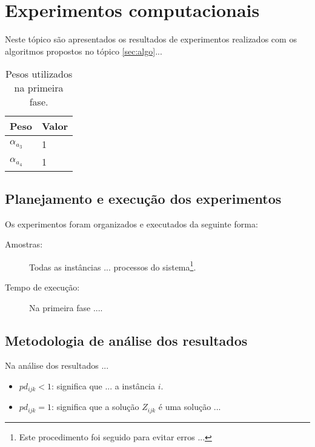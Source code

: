 \chapter{Experimentos computacionais}
\label{sec:experimentos}

Neste tópico são apresentados os resultados de experimentos realizados com os algoritmos propostos no tópico \ref{sec:algo}...

\begin{table*}[htbp]
	\centering
	\caption{Pesos utilizados na primeira fase.}
	\label{tab:pesos_primeira_fase}

	\begin{tabular}{|>{\centering}p{2cm}|p{3cm}<{\centering}|}\hline
		\textbf{Peso} & \textbf{Valor} \\ \hline
		$\alpha_{a_3}$ & 1 \\ \hline
		$\alpha_{a_4}$ & 1 \\ \hline
	\end{tabular}
\end{table*}


\section{Planejamento e execução dos experimentos}

Os experimentos foram organizados e executados da seguinte forma:

\begin{description}
	\item[Amostras:] Todas as instâncias ... processos do sistema\footnote{Este procedimento foi seguido para evitar erros ...}.
	
	\item[Tempo de execução:] Na primeira fase ....  
\end{description}


\section{Metodologia de análise dos resultados}
\label{sec:met_analise}

Na análise dos resultados ...
	
	\begin{itemize}
		 \item $pd_{ijk}<1$: significa que ... a instância $i$.
		 
		 \item $pd_{ijk}=1$: significa que a solução $Z_{ijk}$ é uma solução ...	 
	\end{itemize}
	
